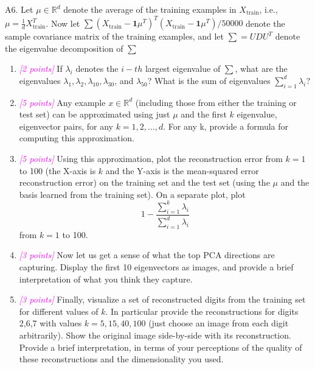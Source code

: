 \documentclass{article}
\newcommand{\field}[1]{\mathbb{#1}}
\newcommand{\1}{\mathbf{1}}
\newcommand{\R}{\field{R}} %
\newcommand{\points}[1]{\small\textcolor{magenta}{\emph{[#1 points]}} \normalsize}
\begin{document}
A6. Let $\mu\in\R^d$ denote the average of the training examples in $X_{\text{train}}$, i.e., $\mu = \frac{1}{d} X^T_{\text{train}}$. Now let $\sum (X_{\text{train}} - \1 \mu^T)^T (X_{\text{train}} - \1\mu^T)/50000$ denote the sample covariance matrix of the training examples, and let $\sum =UDU^T$ denote the eigenvalue decomposition of $\sum$
\begin{enumerate}
    \item \points{2} If $\lambda_i$ denotes the $i-th$ largest eigenvalue of $\sum$, what are the eigenvalues $\lambda_1, \lambda_2, \lambda_{10}, \lambda_{30}$, and $\lambda_{50}$? What is the sum of eigenvalues $\sum^d_{i=1}\lambda_i$?
    
    \item \points{5} Any example $x\in\R^d$ (including those from either the training or test set) can be approximated using just $\mu$ and the first $k$ eigenvalue, eigenvector pairs, for any $k=1,2,\hdots,d$.  For any k, provide a formula for computing this approximation.
    
    \item \points{5} Using this approximation, plot the reconstruction error from $k=1$ to 100 (the X-axis is $k$ and the Y-axis is the mean-squared error reconstruction error) on the training set and the test set (using the $\mu$ and the basis learned from the training set). On a separate plot, plot 
    $$1 - \frac{\sum^k_{i=1}\lambda_i}{\sum^d_{i=1}\lambda_i}$$
    from $k=1$ to 100.
    
    \item \points{3} Now let us get a sense of what the top PCA directions are capturing. Display the first  10 eigenvectors as images, and provide a brief interpretation of what you think they capture.
    
    \item \points{3} Finally, visualize a set of reconstructed digits from the training set for different values of $k$. In particular provide the reconstructions for digits 2,6,7 with values $k=5,15,40,100$ (just choose an image from each digit arbitrarily). Show the original image side-by-side with its reconstruction.  Provide a brief interpretation, in terms of your perceptions of the quality of these reconstructions and the dimensionality you used.
\end{enumerate}
\end{document}
